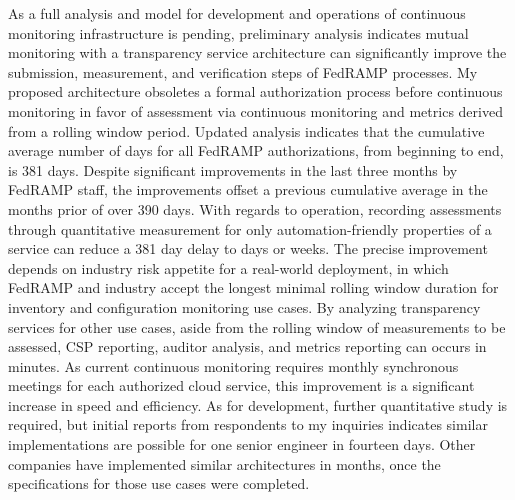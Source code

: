 As a full analysis and model for development and operations of continuous monitoring infrastructure is pending, preliminary analysis indicates mutual monitoring with a transparency service architecture can significantly improve the submission, measurement, and verification steps of FedRAMP processes. My proposed architecture obsoletes a formal authorization process before continuous monitoring in favor of assessment via continuous monitoring and metrics derived from a rolling window period. Updated analysis indicates that the cumulative average number of days for all FedRAMP authorizations, from beginning to end, is 381 days. Despite significant improvements in the last three months by FedRAMP staff, the improvements offset a previous cumulative average in the months prior of over 390 days. With regards to operation, recording assessments through quantitative measurement for only automation-friendly properties of a service can reduce a 381 day delay to days or weeks. The precise improvement depends on industry risk appetite for a real-world deployment, in which FedRAMP and industry accept the longest minimal rolling window duration for inventory and configuration monitoring use cases. By analyzing transparency services for other use cases, aside from the rolling window of measurements to be assessed, CSP reporting, auditor analysis, and metrics reporting can occurs in minutes. As current continuous monitoring requires monthly synchronous meetings for each authorized cloud service, this improvement is a significant increase in speed and efficiency. As for development, further quantitative study is required, but initial reports from respondents to my inquiries indicates similar implementations are possible for one senior engineer in fourteen days. Other companies have implemented similar architectures in months, once the specifications for those use cases were completed.
